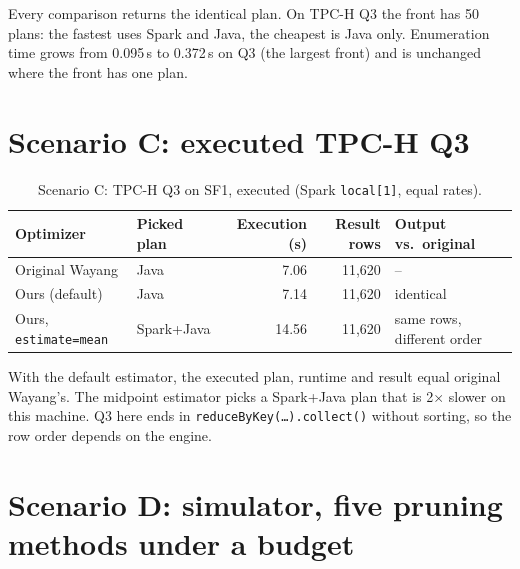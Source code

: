 \documentclass[10pt,a4paper]{article}
\begin{document}
\noindent
Every comparison returns the identical plan. On TPC-H Q3 the front has 50 plans: the fastest uses Spark and Java,
the cheapest is Java only. Enumeration time grows from 0.095\,s to 0.372\,s on Q3 (the largest front) and is
unchanged where the front has one plan.

\section{Scenario C: executed TPC-H Q3}
\begin{table}[h]\centering\small
\caption{Scenario C: TPC-H Q3 on SF1, executed (Spark \texttt{local[1]}, equal rates).}\label{tab:exec}
\begin{tabular}{@{}llrrl@{}}
\toprule
Optimizer & Picked plan & Execution (s) & Result rows & Output vs.\ original\\
\midrule
Original Wayang & Java & 7.06 & 11{,}620 & --\\
Ours (default) & Java & 7.14 & 11{,}620 & identical\\
Ours, \texttt{estimate=mean} & Spark+Java & 14.56 & 11{,}620 & same rows, different order\\
\bottomrule
\end{tabular}
\end{table}

\noindent
With the default estimator, the executed plan, runtime and result equal original Wayang's. The midpoint estimator
picks a Spark+Java plan that is 2$\times$ slower on this machine. Q3 here ends in \texttt{reduceByKey(\dots).collect()}
without sorting, so the row order depends on the engine.

\section{Scenario D: simulator, five pruning methods under a budget}\label{sec:sim}
\end{document}
